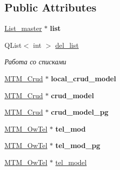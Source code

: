 \subsection*{Public Attributes}
\begin{DoxyCompactItemize}
\item 
\mbox{\label{class_import___form_afc35d0cf5223bcbf50d96dbb2fb80690}} 
\mbox{\hyperlink{class_list__master}{List\+\_\+master}} $\ast$ {\bfseries list}
\item 
Q\+List$<$ int $>$ \mbox{\hyperlink{class_import___form_a392ce459627fa3029413da7c99bb470a}{del\+\_\+list}}
\begin{DoxyCompactList}\small\item\em Работа со списками \end{DoxyCompactList}\item 
\mbox{\label{class_import___form_a67e56193b0fee3bf96aa46dc3ce6a122}} 
\mbox{\hyperlink{class_m_t_m___crud}{M\+T\+M\+\_\+\+Crud}} $\ast$ {\bfseries local\+\_\+crud\+\_\+model}
\item 
\mbox{\label{class_import___form_a13041abbce06bb9b1d6f9410fe509ef1}} 
\mbox{\hyperlink{class_m_t_m___crud}{M\+T\+M\+\_\+\+Crud}} $\ast$ {\bfseries crud\+\_\+model}
\item 
\mbox{\label{class_import___form_a14e1a57087fb2ed7dfa9eed9e3d390c1}} 
\mbox{\hyperlink{class_m_t_m___crud}{M\+T\+M\+\_\+\+Crud}} $\ast$ {\bfseries crud\+\_\+model\+\_\+pg}
\item 
\mbox{\label{class_import___form_ae6b85eaede4d0cf05f20257e75611d47}} 
\mbox{\hyperlink{class_m_t_m___ow_tel}{M\+T\+M\+\_\+\+Ow\+Tel}} $\ast$ {\bfseries tel\+\_\+mod}
\item 
\mbox{\label{class_import___form_aac24ed6677d233e3c6267ff3f78b5454}} 
\mbox{\hyperlink{class_m_t_m___ow_tel}{M\+T\+M\+\_\+\+Ow\+Tel}} $\ast$ {\bfseries tel\+\_\+mod\+\_\+pg}
\item 
\mbox{\label{class_import___form_afe41bd705ad8eda74887ef1d918078a6}} 
\mbox{\hyperlink{class_m_t_m___ow_tel}{M\+T\+M\+\_\+\+Ow\+Tel}} $\ast$ \mbox{\hyperlink{class_import___form_afe41bd705ad8eda74887ef1d918078a6}{tel\+\_\+model}}

\end{DoxyCompactItemize}
